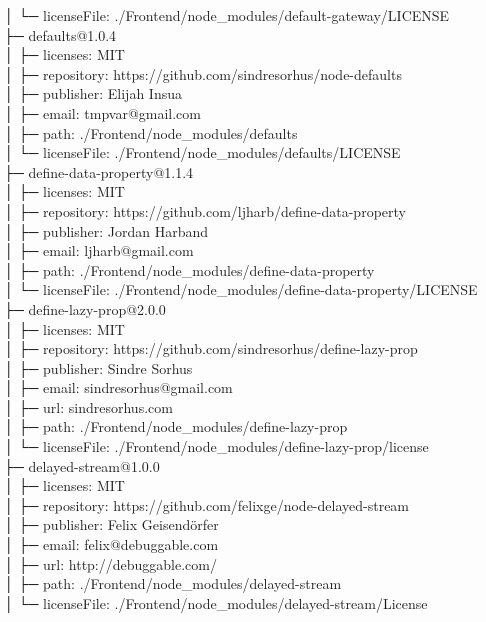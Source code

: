 │  └─ licenseFile: ./Frontend/node\_modules/default-gateway/LICENSE\\
├─ defaults@1.0.4\\
│  ├─ licenses: MIT\\
│  ├─ repository: https://github.com/sindresorhus/node-defaults\\
│  ├─ publisher: Elijah Insua\\
│  ├─ email: tmpvar@gmail.com\\
│  ├─ path: ./Frontend/node\_modules/defaults\\
│  └─ licenseFile: ./Frontend/node\_modules/defaults/LICENSE\\
├─ define-data-property@1.1.4\\
│  ├─ licenses: MIT\\
│  ├─ repository: https://github.com/ljharb/define-data-property\\
│  ├─ publisher: Jordan Harband\\
│  ├─ email: ljharb@gmail.com\\
│  ├─ path: ./Frontend/node\_modules/define-data-property\\
│  └─ licenseFile: ./Frontend/node\_modules/define-data-property/LICENSE\\
├─ define-lazy-prop@2.0.0\\
│  ├─ licenses: MIT\\
│  ├─ repository: https://github.com/sindresorhus/define-lazy-prop\\
│  ├─ publisher: Sindre Sorhus\\
│  ├─ email: sindresorhus@gmail.com\\
│  ├─ url: sindresorhus.com\\
│  ├─ path: ./Frontend/node\_modules/define-lazy-prop\\
│  └─ licenseFile: ./Frontend/node\_modules/define-lazy-prop/license\\
├─ delayed-stream@1.0.0\\
│  ├─ licenses: MIT\\
│  ├─ repository: https://github.com/felixge/node-delayed-stream\\
│  ├─ publisher: Felix Geisendörfer\\
│  ├─ email: felix@debuggable.com\\
│  ├─ url: http://debuggable.com/\\
│  ├─ path: ./Frontend/node\_modules/delayed-stream\\
│  └─ licenseFile: ./Frontend/node\_modules/delayed-stream/License\\

